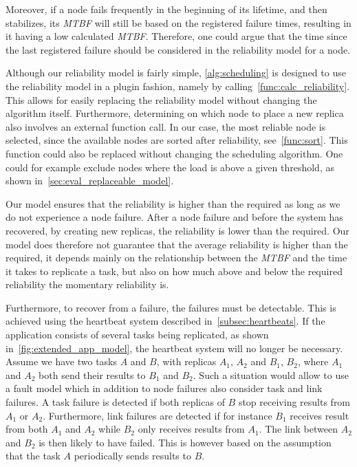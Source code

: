 \documentclass{cslthse-msc}
\begin{document}
Moreover, if a node fails frequently in the beginning of its lifetime, and then stabilizes, its \emph{MTBF} will still be based on the registered failure times, resulting in it having a low calculated \emph{MTBF}. Therefore, one could argue that the time since the last registered failure should be considered in the reliability model for a node.

Although our reliability model is fairly simple, \cref{alg:scheduling} is designed to use the reliability model in a plugin fashion, namely by calling~\cref{func:calc_reliability}. This allows for easily replacing the reliability model without changing the algorithm itself. Furthermore, determining on which node to place a new replica also involves an external function call. In our case, the most reliable node is selected, since the available nodes are sorted after reliability, see~\cref{func:sort}. This function could also be replaced without changing the scheduling algorithm. One could for example exclude nodes where the load is above a given threshold, as shown in~\cref{sec:eval_replaceable_model}.

Our model ensures that the reliability is higher than the required as long as we do not experience a node failure. After a node failure and before the system has recovered, by creating new replicas, the reliability is lower than the required. Our model does therefore not guarantee that the average reliability is higher than the required, it depends mainly on the relationship between the \emph{MTBF} and the time it takes to replicate a task, but also on how much above and below the required reliability the momentary reliability is.

Furthermore, to recover from a failure, the failures must be detectable. This is achieved using the heartbeat system described in~\cref{subsec:heartbeats}. If the application consists of several tasks being replicated, as shown in~\cref{fig:extended_app_model}, the heartbeat system will no longer be necessary. Assume we have two tasks $A$ and $B$, with replicas $A_1$, $A_2$ and $B_1$, $B_2$, where $A_1$ and $A_2$ both send their results to $B_1$ and $B_2$. Such a situation would allow to use a fault model which in addition to node failures also consider task and link failures. A task failure is detected if both replicas of $B$ stop receiving results from $A_1$ or $A_2$. Furthermore, link failures are detected if for instance $B_1$ receives result from both $A_1$ and $A_2$ while $B_2$ only receives results from $A_1$. The link between $A_2$ and $B_2$ is then likely to have failed. This is however based on the assumption that the task $A$ periodically sends results to $B$.
\end{document}
